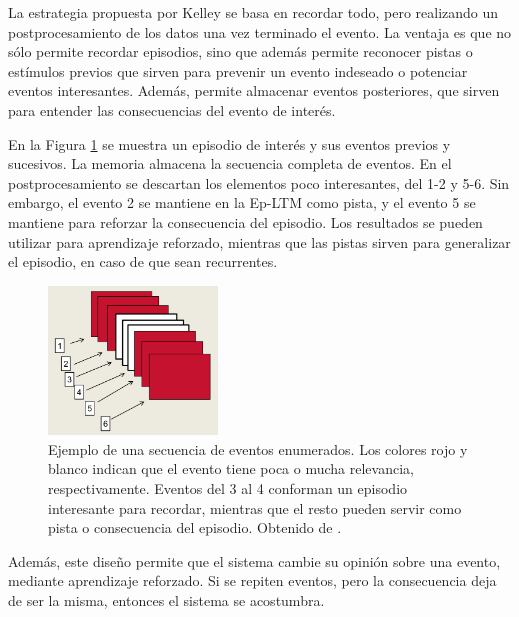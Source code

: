La estrategia propuesta por Kelley se basa en recordar todo, pero realizando un postprocesamiento de los datos una vez terminado el evento. La ventaja es que no sólo permite recordar episodios, sino que además permite reconocer pistas o estímulos previos que sirven para prevenir un evento indeseado o potenciar eventos interesantes. Además, permite almacenar eventos posteriores, que sirven para entender las consecuencias del evento de interés. 

En la Figura \ref{img:sleep_eventos} se muestra un episodio de interés y sus eventos previos y sucesivos. La memoria almacena la secuencia completa de eventos. En el postprocesamiento se descartan los elementos poco interesantes, del 1-2 y 5-6. Sin embargo, el evento 2 se mantiene en la Ep-LTM como pista, y el evento 5 se mantiene para reforzar la consecuencia del episodio. Los resultados se pueden utilizar para aprendizaje reforzado, mientras que las pistas sirven para generalizar el episodio, en caso de que sean recurrentes.

\begin{figure}[H]
\centering
\includegraphics[width=0.4\textwidth]{./figures/eventos.png}
\caption{\small Ejemplo de una secuencia de eventos enumerados. Los colores rojo y blanco indican que el evento tiene poca o mucha relevancia, respectivamente. Eventos del 3 al 4 conforman un episodio interesante para recordar, mientras que el resto pueden servir como pista o consecuencia del episodio. Obtenido de \cite{Kelley2014}.}
\label{img:sleep_eventos}
\end{figure}







Además, este diseño permite que el sistema cambie su opinión sobre una evento, mediante aprendizaje reforzado. Si se repiten eventos, pero la consecuencia deja de ser la misma, entonces el sistema se acostumbra.

